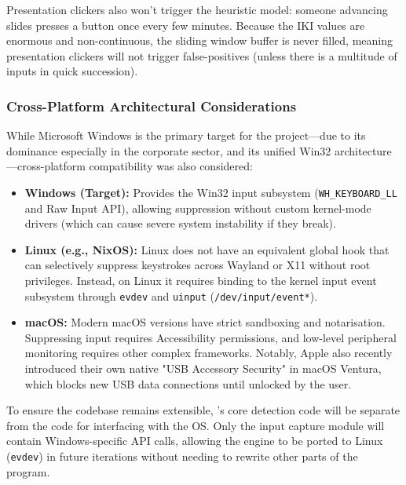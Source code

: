 \begin{note}
	Presentation clickers also won't trigger the heuristic model: someone advancing slides presses a button once every few minutes. Because the $\text{IKI}$ values are enormous and non-continuous, the sliding window buffer is never filled, meaning presentation clickers will not trigger false-positives (unless there is a multitude of inputs in quick succession).
\end{note}

\subsubsection{Cross-Platform Architectural Considerations}

While Microsoft Windows is the primary target for the project---due to its dominance especially in the corporate sector, and its unified Win32 architecture---cross-platform compatibility was also considered:

\begin{itemize}
	\item \textbf{Windows (Target):} Provides the Win32 input subsystem (\texttt{WH\_KEYBOARD\_LL} and Raw Input API), allowing suppression without custom kernel-mode drivers (which can cause severe system instability if they break).
	\item \textbf{Linux (e.g., NixOS):} Linux does not have an equivalent global hook that can selectively suppress keystrokes across Wayland or X11 without root privileges. Instead, on Linux it requires binding to the kernel input event subsystem through \texttt{evdev} and \texttt{uinput} (\texttt{/dev/input/event*}).
	\item \textbf{macOS:} Modern macOS versions have strict sandboxing and notarisation. Suppressing input requires Accessibility permissions, and low-level peripheral monitoring requires other complex frameworks. Notably, Apple also recently introduced their own native "USB Accessory Security" in macOS Ventura, which blocks new USB data connections until unlocked by the user.
\end{itemize}

To ensure the codebase remains extensible, \projectNameFormatted's core detection code will be separate from the code for interfacing with the OS. Only the input capture module will contain Windows-specific API calls, allowing the engine to be ported to Linux (\texttt{evdev}) in future iterations without needing to rewrite other parts of the program.
